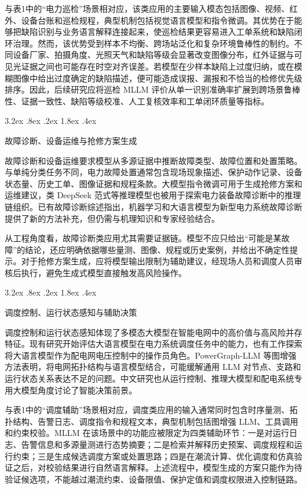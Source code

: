 \documentclass[10.5pt,compsoc]{CjC}
\makeatletter
\renewcommand\subsection{\@startsection{subsection}{2}{\z@}%
  {3.2ex \@plus .8ex \@minus .2ex}%
  {1.8ex \@plus .4ex}%
  {\normalfont\zihao{5}\heiti\bfseries\raggedright}}
\theoremstyle{mystyle}
\makeatother
\begin{document}
与表1中的``电力巡检''场景相对应，该类应用的主要输入模态包括图像、视频、红外、设备台账和巡检规程，典型机制包括视觉语言模型和指令微调。其优势在于能够把缺陷识别与业务语言解释连接起来，使巡检结果更容易进入工单系统和缺陷闭环治理。然而，该优势受到样本不均衡、跨场站泛化和复杂环境鲁棒性的制约。不同设备厂家、拍摄角度、光照天气和缺陷等级会显著改变图像分布，红外证据与可见光证据之间也可能存在时空对齐误差。若模型在少样本缺陷上过度归纳，或在模糊图像中给出过度确定的缺陷描述，便可能造成误报、漏报和不恰当的检修优先级排序。因此，后续研究应将巡检 MLLM 评价从单一识别准确率扩展到跨场景鲁棒性、证据一致性、缺陷等级校准、人工复核效率和工单闭环质量等指标。


\subsection{故障诊断、设备运维与抢修方案生成}

故障诊断和设备运维要求模型从多源证据中推断故障类型、故障位置和处置策略。与单纯分类任务不同，电力故障处置通常包含现场现象描述、保护动作记录、设备状态量、历史工单、图像证据和规程条款。大模型指令微调可用于生成抢修方案和运维建议\cite{deng2026repair}，类 DeepSeek 范式等推理模型也被用于探索电力装备故障诊断中的推理链组织\cite{jiang2025deepseek}。已有故障诊断综述指出，机器学习和大语言模型为新型电力系统故障诊断提供了新的方法补充，但仍需与机理知识和专家经验结合\cite{zhangjianliang2025fault}。

从工程角度看，故障诊断类应用尤其需要证据链。模型不应只给出``可能是某故障''的结论，还应明确依据哪些量测、图像、规程或历史案例，并给出不确定性提示。对于抢修方案生成，应将模型输出限制为辅助建议，经现场人员和调度人员审核后执行，避免生成式模型直接触发高风险操作。


\subsection{调度控制、运行状态感知与辅助决策}

调度控制和运行状态感知体现了多模态大模型在智能电网中的高价值与高风险并存特征。现有研究开始评估大语言模型在电力系统调度任务中的能力\cite{mongaillard2024scheduling}，也有工作探索将大语言模型作为配电网电压控制中的操作员角色\cite{yang2025operator}。PowerGraph-LLM 等图增强方法表明，将电网拓扑结构与语言模型结合，可能缓解通用 LLM 对节点、支路和运行状态关系表达不足的问题\cite{bernier2025powergraph}。中文研究也从运行控制、推理大模型和配电系统专用大模型角度讨论了智能决策前景\cite{zhangjun2023operation,yutao2026reasoning}。

与表1中的``调度辅助''场景相对应，调度类应用的输入通常同时包含时序量测、拓扑结构、告警日志、调度指令和规程文本，典型机制包括图增强 LLM、工具调用和约束校验。MLLM 在该场景中的功能应被限定为四类辅助环节：一是对运行日志、告警信息和多源量测进行态势摘要；二是检索并解释历史预案、调度规程和运行约束；三是生成候选调度方案或处置思路；四是在潮流计算、优化调度和仿真验证之后，对校验结果进行自然语言解释。上述流程中，模型生成的方案只能作为待验证候选项，不能越过潮流约束、设备限值、保护定值和调度权限进入控制链路。
\end{document}

